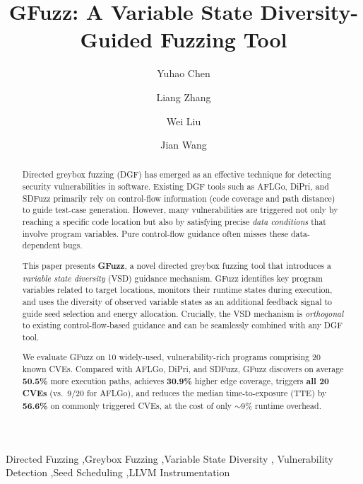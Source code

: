 \documentclass[preprint,12pt,3p]{elsarticle}
\begin{document}
\begin{frontmatter}

\title{GFuzz: A Variable State Diversity-Guided Fuzzing Tool}

\author[inst1]{Yuhao Chen}

\author[inst1]{Liang Zhang}

\author[inst2]{Wei Liu}

\author[inst1]{Jian Wang}




\begin{abstract}
Directed greybox fuzzing (DGF) has emerged as an effective technique for
detecting security vulnerabilities in software.  Existing DGF tools such as
AFLGo, DiPri, and SDFuzz primarily rely on control-flow information (code
coverage and path distance) to guide test-case generation.  However, many
vulnerabilities are triggered not only by reaching a specific code location
but also by satisfying precise \emph{data conditions} that involve program
variables.  Pure control-flow guidance often misses these data-dependent bugs.

This paper presents \textbf{GFuzz}, a novel directed greybox fuzzing tool that
introduces a \emph{variable state diversity} (VSD) guidance mechanism.  GFuzz
identifies key program variables related to target locations, monitors their
runtime states during execution, and uses the diversity of observed variable
states as an additional feedback signal to guide seed selection and energy
allocation.  Crucially, the VSD mechanism is \emph{orthogonal} to existing
control-flow-based guidance and can be seamlessly combined with any DGF tool.

We evaluate GFuzz on 10 widely-used, vulnerability-rich programs comprising
20 known CVEs.  Compared with AFLGo, DiPri, and SDFuzz, GFuzz discovers on
average \textbf{50.5\%} more execution paths, achieves \textbf{30.9\%} higher
edge coverage, triggers \textbf{all 20 CVEs} (vs.\ 9/20 for AFLGo), and
reduces the median time-to-exposure (TTE) by \textbf{56.6\%} on commonly
triggered CVEs, at the cost of only $\sim$9\% runtime overhead.
\end{abstract}

\begin{keyword}
Directed Fuzzing \sep Greybox Fuzzing \sep Variable State Diversity \sep
Vulnerability Detection \sep Seed Scheduling \sep LLVM Instrumentation
\end{keyword}

\end{frontmatter}
\end{document}
